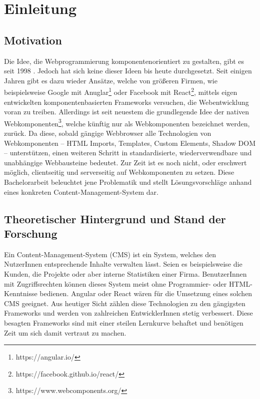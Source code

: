 \chapter{Einleitung}

\section{Motivation}

Die Idee, die Webprogrammierung komponentenorientiert zu gestalten, gibt es seit 1998 \cite{microsoft-webcomponents}. Jedoch hat sich keine dieser Ideen bis heute durchgesetzt.
Seit einigen Jahren gibt es dazu wieder Ansätze, welche von größeren Firmen, wie beispielsweise Google mit Anuglar\footnote{https://angular.io/} oder Facebook mit React\footnote{https://facebook.github.io/react/}, mittels eigen entwickelten komponentenbasierten Frameworks versuchen, die Webentwicklung voran zu treiben. 
Allerdings ist seit neuestem die grundlegende Idee der nativen Webkomponenten\footnote{https://www.webcomponents.org/}, welche künftig nur als Webkomponenten bezeichnet werden, zurück. Da diese, sobald gängige Webbrowser alle Technologien von Webkomponenten -- HTML Imports, Templates, Custom Elements, Shadow DOM -- unterstützen, einen weiteren Schritt in standardisierte, wiederverwendbare und unabhängige Webbausteine bedeutet. Zur Zeit ist es noch nicht, oder erschwert möglich, clientseitig und  serverseitig auf Webkomponenten zu setzen.
Diese Bachelorarbeit beleuchtet jene Problematik und stellt Lösungsvorschläge anhand eines konkreten Content-Management-System dar.


\section{Theoretischer Hintergrund und Stand der Forschung}
\label{sec:hintergrund}

Ein Content-Management-System (CMS) ist ein System, welches den NutzerInnen entsprechende Inhalte verwalten lässt. Seien es beispielsweise die Kunden, die Projekte oder aber interne Statistiken einer Firma. BenutzerInnen mit Zugriffsrechten können dieses System meist ohne Programmier- oder HTML-Kenntnisse bedienen.
Angular oder React wären für die Umsetzung eines solchen CMS geeignet. Aus heutiger Sicht zählen diese Technologien zu den gängigsten Frameworks und werden von zahlreichen EntwicklerInnen stetig verbessert.
Diese besagten Frameworks sind mit einer steilen Lernkurve behaftet und benötigen Zeit um sich damit vertraut zu machen.

